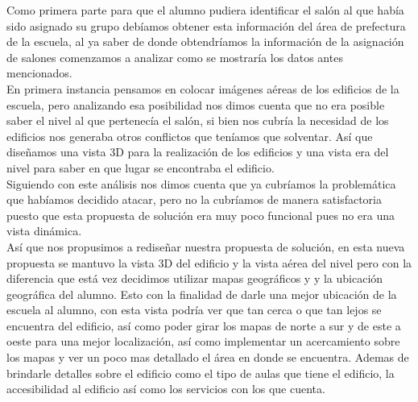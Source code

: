 Como primera parte para que el alumno pudiera identificar el salón al que había sido asignado su grupo debíamos obtener esta información del área de prefectura de la escuela, al ya saber de donde obtendríamos la información de la asignación de salones comenzamos a analizar como se mostraría los datos antes mencionados.\\

En primera instancia pensamos en colocar imágenes aéreas de los edificios de la escuela, pero analizando esa posibilidad nos dimos cuenta que no era posible saber el nivel al que pertenecía el salón, si bien nos cubría la necesidad de los edificios nos generaba otros conflictos que teníamos que solventar. Así que diseñamos una vista 3D para la realización de los edificios y una vista era del nivel para saber en que lugar se encontraba el edificio.\\

Siguiendo con este análisis nos dimos cuenta que ya cubríamos la problemática que habíamos decidido atacar, pero no la cubríamos de manera satisfactoria puesto que esta propuesta de solución era muy poco funcional pues no era una vista dinámica.\\

Así que nos propusimos a rediseñar nuestra propuesta de solución, en esta nueva propuesta se mantuvo la vista 3D del edificio y la vista aérea del nivel pero con la diferencia que está vez decidimos utilizar mapas geográficos y y la ubicación geográfica del alumno. Esto con la finalidad de darle una mejor ubicación de la escuela al alumno, con esta vista podría ver que tan cerca o que tan lejos se encuentra del edificio, así como poder girar los mapas de norte a sur y de este a oeste para una mejor localización, así como implementar un acercamiento sobre los mapas y ver un poco mas detallado el área en donde se encuentra. Ademas de brindarle detalles sobre el edificio como el tipo de aulas que tiene el edificio, la accesibilidad al edificio así como los servicios con los que cuenta.\\

